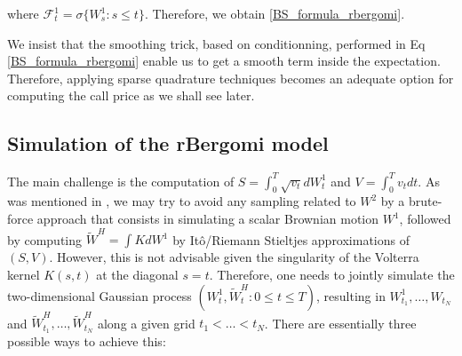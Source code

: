 \documentclass[11pt]{article}
\begin{document}
where $\mathcal{F}_t^1= \sigma\{ W_s^1: s\le t\}$. Therefore, we obtain \eqref{BS_formula_rbergomi}.



We insist that the smoothing trick, based on conditionning, performed in Eq \eqref{BS_formula_rbergomi} enable us to get a smooth term inside the expectation. Therefore, applying sparse quadrature techniques becomes an adequate option for computing the call price as we shall see later.



\subsection{Simulation of the rBergomi model}\label{sec:Simulation of the rBergomi model}

The main challenge is the computation of $S=\int_{0}^{T} \sqrt{v_t} dW_t^1$ and $V=\int_{0}^{T} v_t dt$. As was mentioned in \cite{bayer2017regularity}, we may try to
avoid any sampling related to $W^2$ by   a brute-force approach that  consists in simulating a scalar Brownian motion $W^1$, followed by computing  $\tilde{W}^H= \int K dW^1$  by It\^o/Riemann Stieltjes approximations of $(S,V)$. However, this is not advisable given the singularity of the Volterra kernel $K(s,t)$ at the diagonal $s = t$.
 Therefore,  one needs to jointly simulate the two-dimensional Gaussian process $(W_t^1, \tilde{W}^H_t: 0 \le t \le T)$, resulting in $W^1_{t_1},\dots, W_{t_N}$ and $\tilde{W}^H_{t_1},\dots, \tilde{W}^H_{t_N}$ along a given grid $t_1 <\dots < t_N$. There are essentially three possible ways to achieve this:
\end{document}
